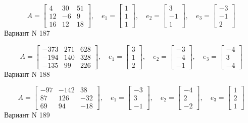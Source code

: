 \documentclass[11pt]{report}
\begin{document}
$$A = \left[\begin{matrix}4 & 30 & 51\\12 & -6 & 9\\16 & 12 & 18\end{matrix}\right],\quad e_1 = \left[\begin{matrix}1\\1\\1\end{matrix}\right],\quad e_2 = \left[\begin{matrix}3\\-1\\1\end{matrix}\right],\quad e_3 = \left[\begin{matrix}-3\\-1\\2\end{matrix}\right]$$Вариант N 187

$$A = \left[\begin{matrix}-373 & 271 & 628\\-194 & 140 & 328\\-135 & 99 & 226\end{matrix}\right],\quad e_1 = \left[\begin{matrix}3\\1\\2\end{matrix}\right],\quad e_2 = \left[\begin{matrix}-3\\-4\\-1\end{matrix}\right],\quad e_3 = \left[\begin{matrix}-4\\3\\-4\end{matrix}\right]$$Вариант N 188

$$A = \left[\begin{matrix}-97 & -142 & 38\\87 & 126 & -32\\69 & 94 & -18\end{matrix}\right],\quad e_1 = \left[\begin{matrix}-3\\3\\-1\end{matrix}\right],\quad e_2 = \left[\begin{matrix}-4\\2\\-2\end{matrix}\right],\quad e_3 = \left[\begin{matrix}1\\2\\1\end{matrix}\right]$$Вариант N 189
\end{document}
